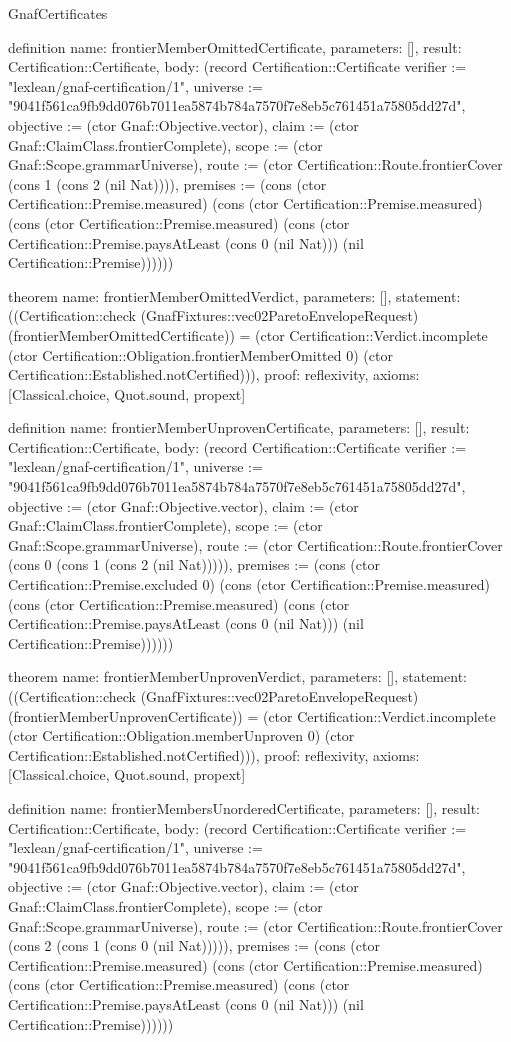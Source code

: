 \begin{lexlean}{GnafCertificates}
\begin{semanticmodule}
definition{
  name: frontierMemberOmittedCertificate,
  parameters: [],
  result: Certification::Certificate,
  body: (record Certification::Certificate {verifier := "lexlean/gnaf-certification/1", universe := "9041f561ca9fb9dd076b7011ea5874b784a7570f7e8eb5c761451a75805dd27d", objective := (ctor Gnaf::Objective.vector), claim := (ctor Gnaf::ClaimClass.frontierComplete), scope := (ctor Gnaf::Scope.grammarUniverse), route := (ctor Certification::Route.frontierCover (cons 1 (cons 2 (nil Nat)))), premises := (cons (ctor Certification::Premise.measured) (cons (ctor Certification::Premise.measured) (cons (ctor Certification::Premise.measured) (cons (ctor Certification::Premise.paysAtLeast (cons 0 (nil Nat))) (nil Certification::Premise)))))})
}

theorem{
  name: frontierMemberOmittedVerdict,
  parameters: [],
  statement: ((Certification::check (GnafFixtures::vec02ParetoEnvelopeRequest) (frontierMemberOmittedCertificate)) = (ctor Certification::Verdict.incomplete (ctor Certification::Obligation.frontierMemberOmitted 0) (ctor Certification::Established.notCertified))),
  proof: reflexivity{},
  axioms: [Classical.choice, Quot.sound, propext]
}

definition{
  name: frontierMemberUnprovenCertificate,
  parameters: [],
  result: Certification::Certificate,
  body: (record Certification::Certificate {verifier := "lexlean/gnaf-certification/1", universe := "9041f561ca9fb9dd076b7011ea5874b784a7570f7e8eb5c761451a75805dd27d", objective := (ctor Gnaf::Objective.vector), claim := (ctor Gnaf::ClaimClass.frontierComplete), scope := (ctor Gnaf::Scope.grammarUniverse), route := (ctor Certification::Route.frontierCover (cons 0 (cons 1 (cons 2 (nil Nat))))), premises := (cons (ctor Certification::Premise.excluded 0) (cons (ctor Certification::Premise.measured) (cons (ctor Certification::Premise.measured) (cons (ctor Certification::Premise.paysAtLeast (cons 0 (nil Nat))) (nil Certification::Premise)))))})
}

theorem{
  name: frontierMemberUnprovenVerdict,
  parameters: [],
  statement: ((Certification::check (GnafFixtures::vec02ParetoEnvelopeRequest) (frontierMemberUnprovenCertificate)) = (ctor Certification::Verdict.incomplete (ctor Certification::Obligation.memberUnproven 0) (ctor Certification::Established.notCertified))),
  proof: reflexivity{},
  axioms: [Classical.choice, Quot.sound, propext]
}

definition{
  name: frontierMembersUnorderedCertificate,
  parameters: [],
  result: Certification::Certificate,
  body: (record Certification::Certificate {verifier := "lexlean/gnaf-certification/1", universe := "9041f561ca9fb9dd076b7011ea5874b784a7570f7e8eb5c761451a75805dd27d", objective := (ctor Gnaf::Objective.vector), claim := (ctor Gnaf::ClaimClass.frontierComplete), scope := (ctor Gnaf::Scope.grammarUniverse), route := (ctor Certification::Route.frontierCover (cons 2 (cons 1 (cons 0 (nil Nat))))), premises := (cons (ctor Certification::Premise.measured) (cons (ctor Certification::Premise.measured) (cons (ctor Certification::Premise.measured) (cons (ctor Certification::Premise.paysAtLeast (cons 0 (nil Nat))) (nil Certification::Premise)))))})
}


\end{semanticmodule}
\end{lexlean}
